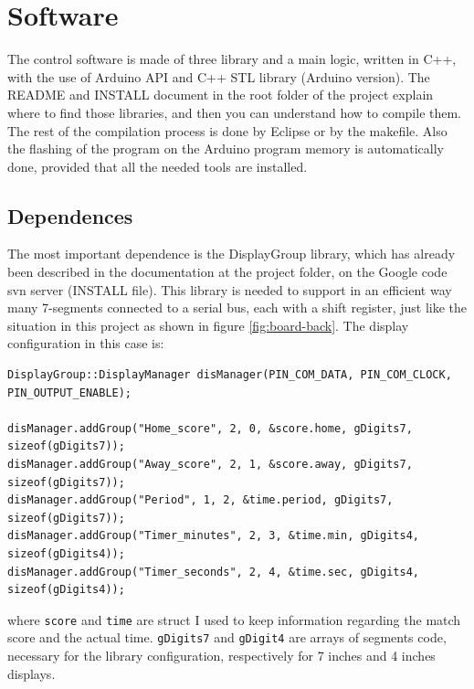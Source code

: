 \documentclass[11pt,english]{article}
\newcommand{\code}[1]{\texttt{#1}}
\begin{document}
\pagebreak

\section{Software}

The control software is made of three library and a main logic, written in C++, with the use of Arduino 
API and C++ STL library (Arduino version). The README and INSTALL document in the root folder of the 
project explain where to find those libraries, and then you can understand how to compile them. The 
rest of the compilation process is done by Eclipse or by the makefile. Also the flashing of the program 
on the Arduino program memory is automatically done, provided that all the needed tools are installed.

\subsection{Dependences}\label{subsec:dep}

The most important dependence is the DisplayGroup library, which has already been described in the 
documentation at the project folder, on the Google code svn server (INSTALL file). This library is needed 
to support in an efficient way many 7-segments connected to a serial bus, each with a shift register, 
just like the situation in this project as shown in figure \ref{fig:board-back}.
The display configuration in this case is:

%
\begin{lstlisting}[label=lis:dis-config,caption=DisplayGroup configuration]
DisplayGroup::DisplayManager disManager(PIN_COM_DATA, PIN_COM_CLOCK, PIN_OUTPUT_ENABLE);

disManager.addGroup("Home_score", 2, 0, &score.home, gDigits7, sizeof(gDigits7));
disManager.addGroup("Away_score", 2, 1, &score.away, gDigits7, sizeof(gDigits7));
disManager.addGroup("Period", 1, 2, &time.period, gDigits7, sizeof(gDigits7));
disManager.addGroup("Timer_minutes", 2, 3, &time.min, gDigits4, sizeof(gDigits4));
disManager.addGroup("Timer_seconds", 2, 4, &time.sec, gDigits4, sizeof(gDigits4));
\end{lstlisting}

where \code{score} and \code{time} are struct I used to keep information regarding the match score and the 
actual time. \code{gDigits7} and \code{gDigit4} are arrays of segments code, necessary for the library 
configuration, respectively for 7 inches and 4 inches displays. 
\end{document}
